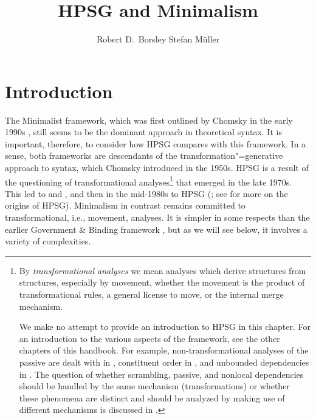 \documentclass[output=paper
                ,modfonts
                ,nonflat
	        ,collection
	        ,collectionchapter
	        ,collectiontoclongg
 	        ,biblatex
                ,babelshorthands
                ,newtxmath
                ,draftmode
                ,colorlinks, citecolor=brown
]{./langsci/langscibook}
\author{%
	Robert D.\ Borsley\affiliation{University of Essex and Bangor University}%
	\lastand Stefan Müller\affiliation{Humboldt-Universität zu Berlin}%
}
\title{HPSG and Minimalism}
\begin{document}
\maketitle
\label{chap-minimalism}

\section{Introduction}
\label{sec:min-intro}


The Minimalist framework, which was first outlined by Chomsky in the early 1990s
\citep{Chomsky93b-u,Chomsky95a-u}, still seems to be the dominant approach in theoretical syntax. It is
important, therefore, to consider how HPSG compares with this framework. In a sense, both frameworks
are descendants of the transformation"=generative approach to syntax, which Chomsky introduced in the
1950s. HPSG is a result of the questioning of transformational analyses\footnote{%
By \emph{transformational analyses} we mean analyses which derive structures from structures, especially
by movement, whether the movement is the product of transformational rules, a general license to
move, or the internal merge mechanism. 

We make no attempt to provide an introduction to HPSG in this chapter. For an introduction to the
various aspects of the framework, see the other chapters of this handbook. For example,
non-transformational analyses of the passive are dealt with in ,
constituent order in , and unbounded dependencies in . The
question of whether scrambling, passive, and nonlocal dependencies should be handled by the same
mechanism (\eg transformations) or whether these phenomena are distinct and should be analyzed by
making use of different mechanisms is discussed in .%
} that emerged in the late
1970s. This led to  \citep{BK82a} and  \citep{GKPS85a}, and then in
the mid-1980s to HPSG (\citealt{ps}; see  for more on the origins of HPSG). Minimalism in contrast
remains committed to transformational, i.e., movement, analyses. It is simpler in some respects than
the earlier Government \& Binding framework \citep{Chomsky81a}, but as we will see below, it involves a variety of
complexities. 
\end{document}
